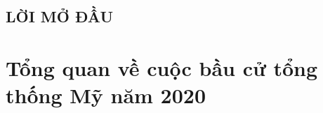 \documentclass[14pt, a4paper]{article}
\numberwithin{equation}{section}
\numberwithin{figure}{section}
\numberwithin{dl}{section}
\numberwithin{md}{section}
\numberwithin{bd}{section}
\numberwithin{dn}{section}
\numberwithin{hq}{section}
\begin{document}
\begin{titlepage}





        \vfill %

    \end{titlepage}

    \cleardoublepage
    \tableofcontents
    \newpage
    \listoffigures
    \newpage
    \glsaddall 
    \renewcommand*{\glossaryname}{Danh mục các từ viết tắt}
    \renewcommand*{\acronymname}{Danh sách từ viết tắt}
    \renewcommand*{\entryname}{Viết tắt}
    \renewcommand*{\descriptionname}{Viết đầy đủ}
    \printnoidxglossary
    \cleardoublepage


    \newpage

    \nocite{*}

    \begin{center}
    \section*{LỜI MỞ ĐẦU}
    \end{center}


    \newpage

    \section{Tổng quan về cuộc bầu cử tổng thống Mỹ năm 2020}
\end{document}
